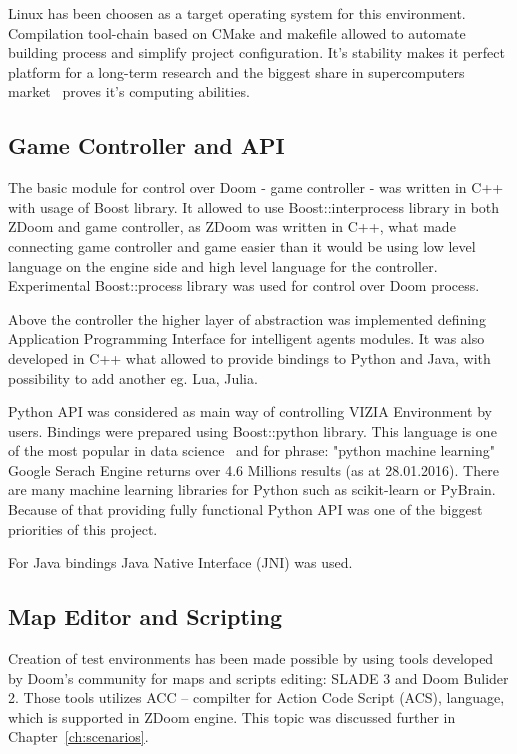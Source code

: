 Linux has been choosen as a target operating system for this environment.
Compilation tool-chain based on CMake and makefile allowed to automate building process and simplify project configuration.
It's stability makes it perfect platform for a long-term research and the biggest share in supercomputers market~\cite{top500} proves it's computing abilities.


\subsection{Game Controller and API}


The basic module for control over Doom - game controller - was written in C++ with usage of Boost library.
It allowed to use Boost::interprocess library in both ZDoom and game controller, as ZDoom was written in C++, what made connecting game controller and game easier than it would be using low level language on the engine side and high level language for the controller.
Experimental Boost::process library was used for control over Doom process.


Above the controller the higher layer of abstraction was implemented defining Application Programming Interface for intelligent agents modules.
It was also developed in C++ what allowed to provide bindings to Python and Java, with possibility to add another eg. Lua, Julia.


Python API was considered as main way of controlling VIZIA Environment by users.
Bindings were prepared  using Boost::python library.
This language is one of the most popular in data science~\cite{ds_lang} and for phrase: "python machine learning" Google Serach Engine returns over 4.6 Millions results (as at 28.01.2016).
There are many machine learning libraries for Python such as scikit-learn or PyBrain.
Because of that providing fully functional Python API was one of the biggest priorities of this project.


For Java bindings Java Native Interface (JNI) was used.


\subsection{Map Editor and Scripting}


Creation of test environments has been made possible by using tools developed by Doom's community for maps and scripts editing: SLADE 3 and Doom Bulider 2. Those tools utilizes ACC -- compilter for Action Code Script (ACS), language, which is supported in ZDoom engine.
This topic was discussed further in Chapter~\ref{ch:scenarios}.

